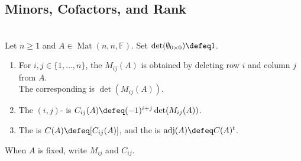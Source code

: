 \subsection{Minors, Cofactors, and Rank}

\begin{definition} \label{def:minors-cofactors-and-adjugate} \\
Let $n\geq1$ and $A\in\operatorname{Mat}(n,n,\mathbb{F})$. Set $\det(\emptyset_{0\times0})\defeq1$.
\begin{enumerate}[label=(\roman*)]
\setlength{\itemsep}{0pt}
\item For $i,j\in\{1,\ldots,n\}$, the  $M_{ij}(A)$ is obtained by deleting row $i$ and column $j$ from $A$.\\
The corresponding  is $\det(M_{ij}(A))$.
\item The $(i,j)$- is $C_{ij}(A)\defeq(-1)^{i+j}\det(M_{ij}(A))$.
\item The  is $C(A)\defeq[C_{ij}(A)]$, and the  is $\operatorname{adj}(A)\defeq C(A)^t$.
\end{enumerate}
When $A$ is fixed, write $M_{ij}$ and $C_{ij}$.
\end{definition}

